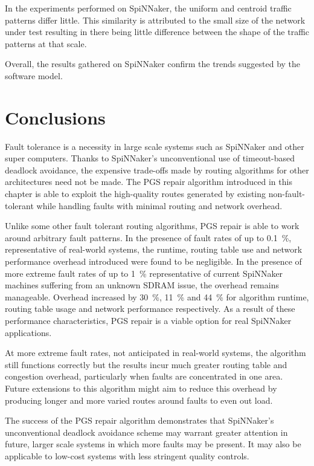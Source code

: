 				In the experiments performed on SpiNNaker, the uniform and centroid
				traffic patterns differ little. This similarity is attributed to the
				small size of the network under test resulting in there being little
				difference between the shape of the traffic patterns at that scale.
				
				Overall, the results gathered on SpiNNaker confirm the trends suggested
				by the software model.
		
	\section{Conclusions}
		
		Fault tolerance is a necessity in large scale systems such as SpiNNaker and
		other super computers. Thanks to SpiNNaker's unconventional use of
		timeout-based deadlock avoidance, the expensive trade-offs made by routing
		algorithms for other architectures need not be made. The PGS repair
		algorithm introduced in this chapter is able to exploit the high-quality
		routes generated by existing non-fault-tolerant while handling faults with
		minimal routing and network overhead.
		
		Unlike some other fault tolerant routing algorithms, PGS repair is able to
		work around arbitrary fault patterns.  In the presence of fault rates of up
		to \SI{0.1}{\percent}, representative of real-world systems, the runtime,
		routing table use and network performance overhead introduced were found to
		be negligible.  In the presence of more extreme fault rates of up to
		\SI{1}{\percent} representative of current SpiNNaker machines suffering
		from an unknown SDRAM issue, the overhead remains manageable. Overhead
		increased by \SI{30}{\percent}, \SI{11}{\percent} and \SI{44}{\percent} for
		algorithm runtime, routing table usage and network performance
		respectively.  As a result of these performance characteristics, PGS repair
		is a viable option for real SpiNNaker applications.
		
		At more extreme fault rates, not anticipated in real-world systems, the
		algorithm still functions correctly but the results incur much greater
		routing table and congestion overhead, particularly when faults are
		concentrated in one area. Future extensions to this algorithm might aim to
		reduce this overhead by producing longer and more varied routes around
		faults to even out load.
		
		The success of the PGS repair algorithm demonstrates that SpiNNaker's
		unconventional deadlock avoidance scheme may warrant greater attention in
		future, larger scale systems in which more faults may be present. It may
		also be applicable to low-cost systems with less stringent quality
		controls.
